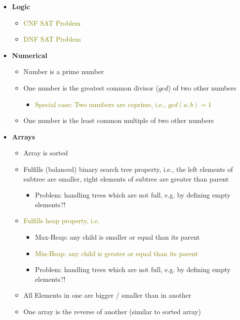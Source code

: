 \documentclass{article}
\newcommand{\narrow}{\setlength\itemsep{0pt}}
\begin{document}
\begin{itemize}\narrow
    \item \textbf{Logic}
    \begin{itemize}
        \item \textcolor{olive}{CNF SAT Problem}
        \item \textcolor{olive}{DNF SAT Problem}
    \end{itemize}
    \item \textbf{Numerical}
    \begin{itemize}
        \item Number is a prime number
        \item One number is the greatest common divisor ($gcd$) of two other numbers
        \begin{itemize}
            \item \textcolor{olive}{Special case: Two numbers are coprime, i.e., $gcd(a,b) = 1$}
        \end{itemize}
        \item One number is the least common multiple of two other numbers
    \end{itemize}
    \item \textbf{Arrays}
    \begin{itemize}
        \item Array is sorted
        \item Fulfills (balanced) binary search tree property, i.e., the left elements of subtree are smaller, right elements of subtree are greater than parent
        \begin{itemize}
            \item Problem: handling trees which are not full, e.g. by defining empty elements?!
        \end{itemize}
        \item \textcolor{olive}{Fulfills heap property, i.e.}
        \begin{itemize}
            \item Max-Heap: any child is smaller or equal than its parent
            \item \textcolor{olive}{Min-Heap: any child is greater or equal than its parent}
            \item Problem: handling trees which are not full, e.g. by defining empty elements?!
        \end{itemize}
        \item All Elements in one are bigger / smaller than in another
        \item One array is the reverse of another (similar to sorted array)

\end{itemize}
\end{itemize}
\end{document}

